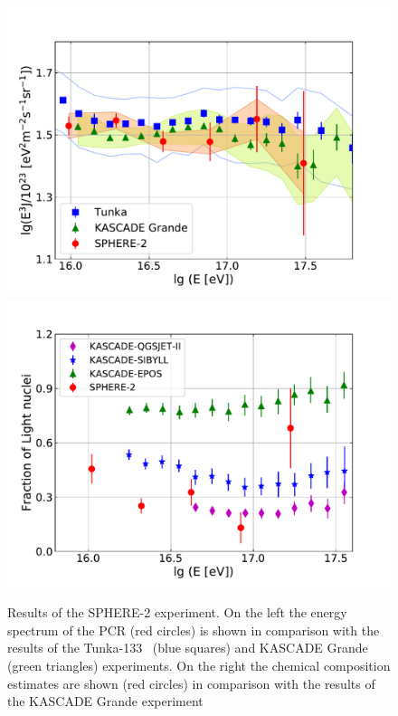 \documentclass[a4paper]{jpconf}
\begin{document}
\begin{figure}[t]
\centering %
\hfill
\includegraphics[height=.25\textheight]{sphere2spectrum.pdf}
\hfill
\includegraphics[height=.25\textheight]{sphere2composition.pdf}
\hfill
\caption{Results of the SPHERE-2 experiment. On the left the energy spectrum of the PCR (red circles) is shown in comparison with the results of the Tunka-133~\cite{Tunka2020} (blue squares) and KASCADE Grande~\cite{Ape12} (green triangles) experiments. On the right the chemical composition estimates are shown (red circles) in comparison with the results of the KASCADE Grande experiment~\cite{Ape13}}
\label{fig:Sphere_results}
\end{figure}
\end{document}
